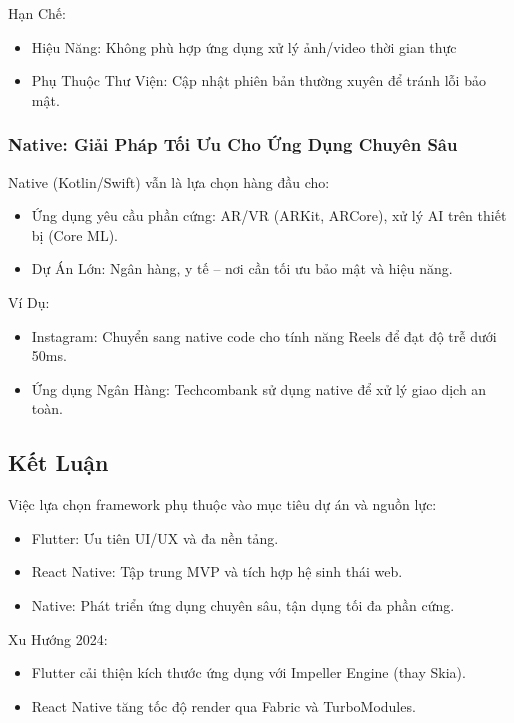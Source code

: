       Hạn Chế:
      \setlength{\leftmargini}{1.5cm}
      \begin{itemize}
          \item Hiệu Năng: Không phù hợp ứng dụng xử lý ảnh/video thời gian thực
          \item Phụ Thuộc Thư Viện: Cập nhật phiên bản thường xuyên để tránh lỗi bảo mật.
      \end{itemize}

    \subsubsection{Native: Giải Pháp Tối Ưu Cho Ứng Dụng Chuyên Sâu}
    
      Native (Kotlin/Swift) vẫn là lựa chọn hàng đầu cho:
      \setlength{\leftmargini}{1.5cm}
      \begin{itemize}
        \item Ứng dụng yêu cầu phần cứng: AR/VR (ARKit, ARCore), xử lý AI trên thiết bị (Core ML).
        \item Dự Án Lớn: Ngân hàng, y tế – nơi cần tối ưu bảo mật và hiệu năng.
      \end{itemize}

    
      Ví Dụ:
      \setlength{\leftmargini}{1.5cm}
      \begin{itemize}
          \item Instagram: Chuyển sang native code cho tính năng Reels để đạt độ trễ dưới 50ms.
          \item Ứng dụng Ngân Hàng: Techcombank sử dụng native để xử lý giao dịch an toàn.
      \end{itemize}

\subsection{Kết Luận}
\renewcommand{\labelitemi}{--}    

  Việc lựa chọn framework phụ thuộc vào mục tiêu dự án và nguồn lực:
  \setlength{\leftmargini}{1.5cm}
  \begin{itemize}
      \item Flutter: Ưu tiên UI/UX và đa nền tảng.
      \item React Native: Tập trung MVP và tích hợp hệ sinh thái web.
      \item Native: Phát triển ứng dụng chuyên sâu, tận dụng tối đa phần cứng.
  \end{itemize}


  Xu Hướng 2024:
  \setlength{\leftmargini}{1.5cm}
  \begin{itemize}
      \item Flutter cải thiện kích thước ứng dụng với Impeller Engine (thay Skia).
      \item React Native tăng tốc độ render qua Fabric và TurboModules.
  \end{itemize}
